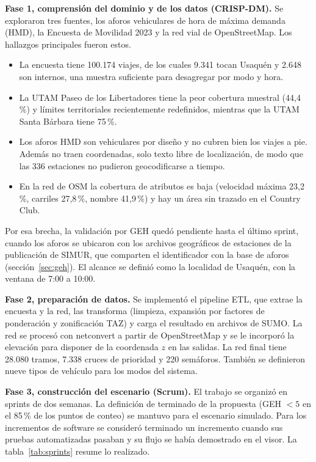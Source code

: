 \textbf{Fase 1, comprensión del dominio y de los datos (CRISP-DM).}
\label{sec:fase1}
Se exploraron tres fuentes, los aforos vehiculares de hora de máxima demanda (HMD), la Encuesta de Movilidad 2023 y la red vial de OpenStreetMap. Los hallazgos principales fueron estos.
\begin{itemize}[noitemsep]
    \item La encuesta tiene 100.174 viajes, de los cuales 9.341 tocan Usaquén y 2.648 son internos, una muestra suficiente para desagregar por modo y hora.
    \item La UTAM Paseo de los Libertadores tiene la peor cobertura muestral (44,4\,\%) y límites territoriales recientemente redefinidos, mientras que la UTAM Santa Bárbara tiene 75\,\%.
    \item Los aforos HMD son vehiculares por diseño y no cubren bien los viajes a pie. Además no traen coordenadas, solo texto libre de localización, de modo que las 336 estaciones no pudieron geocodificarse a tiempo.
    \item En la red de OSM la cobertura de atributos es baja (velocidad máxima 23,2\,\%, carriles 27,8\,\%, nombre 41,9\,\%) y hay un área sin trazado en el Country Club.
\end{itemize}
Por esa brecha, la validación por GEH quedó pendiente hasta el último sprint, cuando los aforos se ubicaron con los archivos geográficos de estaciones de la publicación de SIMUR, que comparten el identificador con la base de aforos (sección~\ref{sec:geh}). El alcance se definió como la localidad de Usaquén, con la ventana de 7:00 a 10:00.

\textbf{Fase 2, preparación de datos.} Se implementó el pipeline ETL, que extrae la encuesta y la red, las transforma (limpieza, expansión por factores de ponderación y zonificación TAZ) y carga el resultado en archivos de SUMO. La red se procesó con netconvert a partir de OpenStreetMap y se le incorporó la elevación para disponer de la coordenada $z$ en las salidas. La red final tiene 28.080 tramos, 7.338 cruces de prioridad y 220 semáforos. También se definieron nueve tipos de vehículo para los modos del sistema.

\textbf{Fase 3, construcción del escenario (Scrum).} El trabajo se organizó en sprints de dos semanas. La definición de terminado de la propuesta (GEH $<5$ en el 85\,\% de los puntos de conteo) se mantuvo para el escenario simulado. Para los incrementos de software se consideró terminado un incremento cuando sus pruebas automatizadas pasaban y su flujo se había demostrado en el visor. La tabla~\ref{tab:sprints} resume lo realizado.

